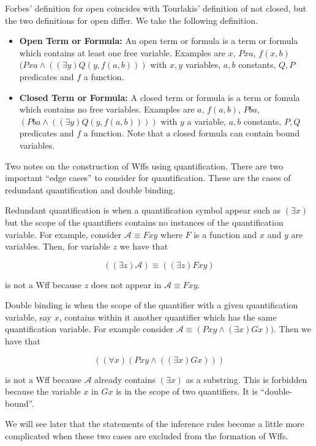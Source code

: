 \documentclass[12pt]{article}
\newcommand{\mc}[1]{\mathcal{#1}}
\begin{document}
Forbes' definition for open coincides with Tourlakis' definition of not closed, but the two definitions for open differ. We take the following definition.

\hrulefill
\begin{itemize}
\item{\textbf{Open Term or Formula:} An open term or formula is a term or formula which contains at least one free variable. Examples are $x$, $Pxa$, $f(x,b)$ $(Pxa \land ((\exists y) Q(y,f(a,b)))$ with $x,y$ variables, $a,b$ constants, $Q,P$ predicates and $f$ a function.}
\item{\textbf{Closed Term or Formula:} A closed term or formula is a term or fomula which contains no free variables. Examples are $a$, $f(a,b)$, $Pba$, $(Pba \land ((\exists y)Q(y,f(a,b))))$ with $y$ a variable, $a,b$ constants, $P,Q$ predicates and $f$ a function. Note that a closed formula can contain bound variables.}
\end{itemize}
\hrulefill

Two notes on the construction of Wffs using quantification. There are two important ``edge cases'' to consider for quantification. These are the cases of redundant quantification and double binding.

Redundant quantification is when a quantification symbol appear such as $(\exists x)$ but the scope of the quantifiers contains no instances of the quantification variable. For example, consider $\mc{A} \equiv Fxy$ where $F$ is a function and $x$ and $y$ are variables. Then, for variable $z$ we have that

$$
((\exists z)\mc{A}) \equiv ((\exists z)Fxy)
$$

is not a Wff because $z$ does not appear in $\mc{A} \equiv Fxy$.

Double binding is when the scope of the quantifier with a given quantification variable, say $x$, contains within it another quantifier which has the same quantification variable. For example consider $\mc{A} \equiv (Pxy \land (\exists x)Gx))$. Then we have that

$$
((\forall x)(Pxy \land ((\exists x)Gx)))
$$

is not a Wff because $\mc{A}$ already contains $(\exists x)$ as a substring. This is forbidden because the variable $x$ in $Gx$ is in the scope of two quantifiers. It is ``double-bound''.

We will see later that the statements of the inference rules become a little more complicated when these two cases are excluded from the formation of Wffs.
\end{document}
